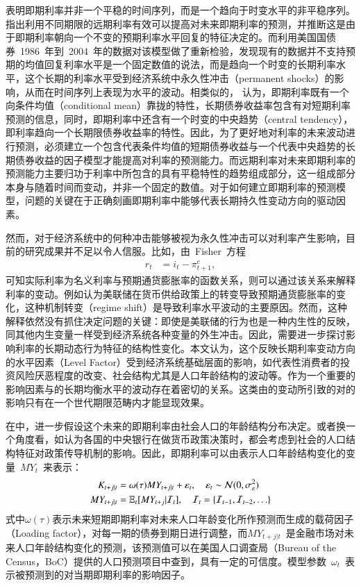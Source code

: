  表明即期利率并非一个平稳的时间序列，而是一个趋向于时变水平的非平稳序列。指出利用不同期限的远期利率有效可以提高对未来即期利率的预测，并推断这是由于即期利率朝向一个不变的预期利率水平回复的特征决定的。而利用美国国债券~1986~年到~2004~年的数据对该模型做了重新检验，发现现有的数据并不支持预期的均值回复利率水平是一个固定数值的说法，而是趋向一个时变的长期利率水平，这个长期的利率水平受到经济系统中永久性冲击（permanent shocks）的影响，从而在时间序列上表现为水平的波动。相类似的， 认为，即期利率既有一个向条件均值（conditional mean）靠拢的特性，长期债券收益率包含有对短期利率预测的信息，同时，即期利率中还含有一个时变的中央趋势（central tendency），即利率趋向一个长期限债券收益率的特性。因此，为了更好地对利率的未来波动进行预测，必须建立一个包含代表条件均值的短期债券收益与一个代表中央趋势的长期债券收益的因子模型才能提高对利率的预测能力。而远期利率对未来即期利率的预测能力主要归功于利率中所包含的具有平稳特性的趋势组成部分，这一组成部分本身与随着时间而变动，并非一个固定的数值。对于如何建立即期利率的预测模型，问题的关键在于正确刻画即期利率中能够代表长期持久性变动方向的驱动因素。

 然而，对于经济系统中的何种冲击能够被视为永久性冲击可以对利率产生影响，目前的研究成果并不足以令人信服。比如，由~Fisher~方程
\begin{align}
  r_t &= i_t - \pi_{t+1}^e,
\end{align}
可知实际利率为名义利率与预期通货膨胀率的函数关系，则可以通过该关系来解释利率的变动。例如认为美联储在货币供给政策上的转变导致预期通货膨胀率的变化，这种机制转变（regime shift）是导致利率水平波动的主要原因。然而，这种解释依然没有抓住决定问题的关键：即使是美联储的行为也是一种内生性的反映，同其他内生变量一样受到经济系统各种变量的外生冲击。因此，需要进一步探讨影响利率的长期动态行为特征的结构性变化。本文认为，这个反映长期利率变动方向的水平因素（Level Factor）受到经济系统基础层面的影响，如代表性消费者的投资风险厌恶程度的改变、社会结构尤其是人口年龄结构的波动等。\ds 作为一个重要的影响因素与\ts 的长期均衡水平的波动存在着密切的关系。这类由\ds 的变动所引致的对\tsm 的影响只有在一个世代期限范畴内才能显现效果。

在中，进一步假设这个未来的即期利率由社会人口的年龄结构分布决定。或者换一个角度看，如认为各国的中央银行在做货币政策决策时，都会考虑到社会的人口结构特征对政策传导机制的影响。因此，即期利率可以由表示人口年龄结构变化的变量~$MY_t$~来表示：
 \begin{align}
   K_{t+j|t}  &= \omega(\tau) MY_{t+j|t}+\varepsilon_t, \quad \varepsilon_t \sim \mathcal{N}(0,\sigma^2_{\varepsilon})\\
   MY_{t+j|t} &= \mathbb{E}_t [MY_{t+j}|\mathcal{I}_t],\quad \mathcal{I}_t=\{\mathcal{I}_{t-1},\mathcal{I}_{t-2},\ldots\}
 \end{align}
式中$\omega(\tau)$表示未来短期即期利率对未来人口年龄变化所作预测而生成的载荷因子（Loading factor），对每一期的债券到期日进行调整，而$MY_{t+j|t}$~是金融市场对未来人口年龄结构变化的预测，该预测值可以在美国人口调查局（Bureau of the Census，BoC）提供的人口预测项目中查到，具有一定的可信度。模型参数~$\omega_t$~表示被预测到的\dsf 对当期即期利率的影响因子。

